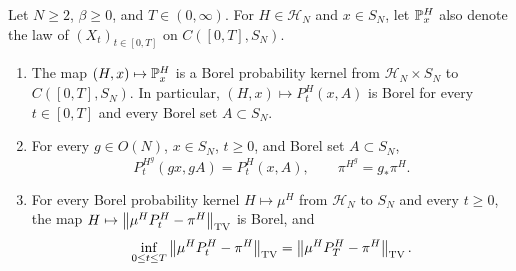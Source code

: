\begin{lemma}\label{lem:red-kernels}
Let $N\ge2$, $\beta\ge0$, and $T\in(0,\infty)$. For $H\in\mathcal H_N$ and $x\in S_N$, let $\mathbb P^H_x$ also denote the law of $(X_t)_{t\in[0,T]}$ on $C([0,T],S_N)$.
\begin{enumerate}[label=(\alph*)]
\item The map $(H,x)\mapsto\mathbb P^H_x$ is a Borel probability kernel from $\mathcal H_N\times S_N$ to $C([0,T],S_N)$. In particular, $(H,x)\mapsto P^H_t(x,A)$ is Borel for every $t\in[0,T]$ and every Borel set $A\subset S_N$.
\item For every $g\in O(N)$, $x\in S_N$, $t\ge0$, and Borel set $A\subset S_N$,
\begin{equation}\label{eq:red-covariance}
P^{H^g}_t(gx,gA)=P^H_t(x,A),\qquad\pi^{H^g}=g_*\pi^H.
\end{equation}
\item For every Borel probability kernel $H\mapsto\mu^H$ from $\mathcal H_N$ to $S_N$ and every $t\ge0$, the map $H\mapsto\left\lVert\mu^HP^H_t-\pi^H\right\rVert_{\mathrm{TV}}$ is Borel, and
\begin{equation}\label{eq:red-contraction}
\inf_{0\le t\le T}\left\lVert\mu^HP^H_t-\pi^H\right\rVert_{\mathrm{TV}}=\left\lVert\mu^HP^H_T-\pi^H\right\rVert_{\mathrm{TV}}.
\end{equation}
\end{enumerate}
\end{lemma}


